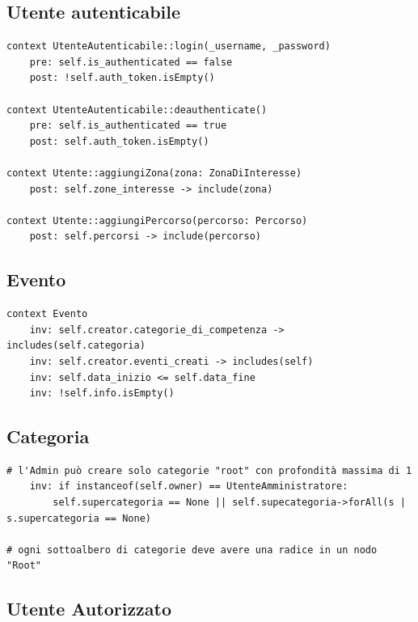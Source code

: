 \documentclass{article}
\begin{document}
\subsection{Utente autenticabile}

\begin{verbatim}
context UtenteAutenticabile::login(_username, _password)
    pre: self.is_authenticated == false
    post: !self.auth_token.isEmpty()

context UtenteAutenticabile::deauthenticate()
    pre: self.is_authenticated == true
    post: self.auth_token.isEmpty()

context Utente::aggiungiZona(zona: ZonaDiInteresse)
    post: self.zone_interesse -> include(zona)

context Utente::aggiungiPercorso(percorso: Percorso)
    post: self.percorsi -> include(percorso)
\end{verbatim}

\subsection{Evento}

\begin{verbatim}
context Evento
    inv: self.creator.categorie_di_competenza -> includes(self.categoria)
    inv: self.creator.eventi_creati -> includes(self)
    inv: self.data_inizio <= self.data_fine
    inv: !self.info.isEmpty()
\end{verbatim}

\subsection{Categoria}

\begin{verbatim}
# l'Admin può creare solo categorie "root" con profondità massima di 1
    inv: if instanceof(self.owner) == UtenteAmministratore:
        self.supercategoria == None || self.supecategoria->forAll(s | s.supercategoria == None)

# ogni sottoalbero di categorie deve avere una radice in un nodo "Root"
\end{verbatim}

\clearpage

\subsection{Utente Autorizzato}
\end{document}
